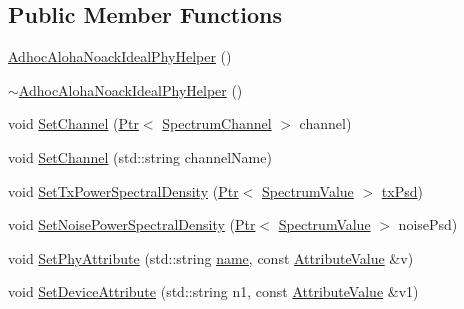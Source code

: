 \subsection*{Public Member Functions}
\begin{DoxyCompactItemize}
\item 
\hyperlink{classns3_1_1AdhocAlohaNoackIdealPhyHelper_a40d9c45aafaadf9da12a7159d5b91597}{Adhoc\+Aloha\+Noack\+Ideal\+Phy\+Helper} ()
\item 
\hyperlink{classns3_1_1AdhocAlohaNoackIdealPhyHelper_abc190f70a9a1d0a165e32e0c81b08c6b}{$\sim$\+Adhoc\+Aloha\+Noack\+Ideal\+Phy\+Helper} ()
\item 
void \hyperlink{classns3_1_1AdhocAlohaNoackIdealPhyHelper_a9d2c05e23d722e63dafa2d083313ecdb}{Set\+Channel} (\hyperlink{classns3_1_1Ptr}{Ptr}$<$ \hyperlink{classns3_1_1SpectrumChannel}{Spectrum\+Channel} $>$ channel)
\item 
void \hyperlink{classns3_1_1AdhocAlohaNoackIdealPhyHelper_ab44ab6a82cba65c21c1d8033986c888f}{Set\+Channel} (std\+::string channel\+Name)
\item 
void \hyperlink{classns3_1_1AdhocAlohaNoackIdealPhyHelper_a3acada700018db8e04a7a209e4cdf94e}{Set\+Tx\+Power\+Spectral\+Density} (\hyperlink{classns3_1_1Ptr}{Ptr}$<$ \hyperlink{classns3_1_1SpectrumValue}{Spectrum\+Value} $>$ \hyperlink{lte__link__budget__x2__handover__measures_8m_a684fe3101a5e48a5fcc57cab8dbcd1aa}{tx\+Psd})
\item 
void \hyperlink{classns3_1_1AdhocAlohaNoackIdealPhyHelper_a6a5f5df28a9bddbe04e8e4815bdce244}{Set\+Noise\+Power\+Spectral\+Density} (\hyperlink{classns3_1_1Ptr}{Ptr}$<$ \hyperlink{classns3_1_1SpectrumValue}{Spectrum\+Value} $>$ noise\+Psd)
\item 
void \hyperlink{classns3_1_1AdhocAlohaNoackIdealPhyHelper_a073f6728abd6e3880475b29cbc415792}{Set\+Phy\+Attribute} (std\+::string \hyperlink{generate__test__data__lte__spectrum__model_8m_ab74e6bf80237ddc4109968cedc58c151}{name}, const \hyperlink{classns3_1_1AttributeValue}{Attribute\+Value} \&v)
\item 
void \hyperlink{classns3_1_1AdhocAlohaNoackIdealPhyHelper_a5419a27f0ed8f8aa012fdc372cf3f62b}{Set\+Device\+Attribute} (std\+::string n1, const \hyperlink{classns3_1_1AttributeValue}{Attribute\+Value} \&v1)
\item 

\end{DoxyCompactItemize}
